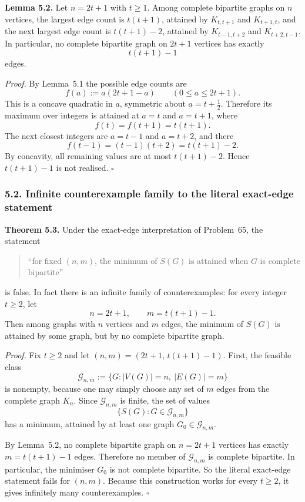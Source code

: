 \medskip
\textbf{Lemma 5.2.}
Let $n=2t+1$ with $t\ge 1$.
Among complete bipartite graphs on $n$ vertices, the largest edge count is $t(t+1)$, attained by $K_{t,t+1}$ and $K_{t+1,t}$, and the next largest edge count is $t(t+1)-2$, attained by $K_{t-1,t+2}$ and $K_{t+2,t-1}$.
In particular, no complete bipartite graph on $2t+1$ vertices has exactly
\[
t(t+1)-1
\]
edges.

\medskip
\textit{Proof.}
By Lemma~5.1 the possible edge counts are
\[
f(a):=a(2t+1-a)\qquad(0\le a\le 2t+1).
\]
This is a concave quadratic in $a$, symmetric about $a=t+\tfrac12$.
Therefore its maximum over integers is attained at $a=t$ and $a=t+1$, where
\[
f(t)=f(t+1)=t(t+1).
\]
The next closest integers are $a=t-1$ and $a=t+2$, and there
\[
f(t-1)=(t-1)(t+2)=t(t+1)-2.
\]
By concavity, all remaining values are at most $t(t+1)-2$.
Hence $t(t+1)-1$ is not realised.
\hfill$\square$

\subsubsection*{5.2. Infinite counterexample family to the literal exact-edge statement}

\textbf{Theorem 5.3.}
Under the exact-edge interpretation of Problem~65, the statement
\begin{quote}
``for fixed $(n,m)$, the minimum of $S(G)$ is attained when $G$ is complete bipartite''
\end{quote}
is false.
In fact there is an infinite family of counterexamples: for every integer $t\ge 2$, let
\[
n=2t+1,
\qquad
m=t(t+1)-1.
\]
Then among graphs with $n$ vertices and $m$ edges, the minimum of $S(G)$ is attained by some graph, but by no complete bipartite graph.

\medskip
\textit{Proof.}
Fix $t\ge 2$ and let $(n,m)=(2t+1,\,t(t+1)-1)$.
First, the feasible class
\[
\mathcal G_{n,m}:=\{G:|V(G)|=n,\ |E(G)|=m\}
\]
is nonempty, because one may simply choose any set of $m$ edges from the complete graph $K_n$.
Since $\mathcal G_{n,m}$ is finite, the set of values
\[
\{S(G):G\in\mathcal G_{n,m}\}
\]
has a minimum, attained by at least one graph $G_0\in\mathcal G_{n,m}$.

By Lemma~5.2, no complete bipartite graph on $n=2t+1$ vertices has exactly $m=t(t+1)-1$ edges.
Therefore no member of $\mathcal G_{n,m}$ is complete bipartite.
In particular, the minimiser $G_0$ is not complete bipartite.
So the literal exact-edge statement fails for $(n,m)$.
Because this construction works for every $t\ge 2$, it gives infinitely many counterexamples.
\hfill$\square$

